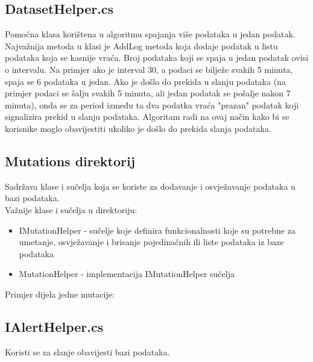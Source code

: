 \documentclass[zavrsnirad]{fer}
\begin{document}


\subsection{DatasetHelper.cs}
\label{pog:dataset_helper}
Pomoćna klasa korištena u algoritmu spajanja više podataka u jedan podatak. Najvažnija metoda u klasi je AddLog metoda koja dodaje podatak u listu podataka koja se kasnije vraća. Broj podataka koji se spaja u jedan podatak ovisi o intervalu. Na primjer ako je interval 30, a podaci se bilježe svakih 5 minuta, spaja se 6 podataka u jedan. Ako je došlo do prekida u slanju podataka (na primjer podaci se šalju svakih 5 minuta, ali jedan podatak se pošalje nakon 7 minuta), onda se za period između ta dva podatka vraća "prazan" podatak koji signalizira prekid u slanju podataka. Algoritam radi na ovaj način kako bi se korisnike moglo obavijestiti ukoliko je došlo do prekida slanja podataka.


\subsection{Mutations direktorij}
Sadržava klase i sučelja koja se koriste za dodavanje i osvježavanje podataka u bazi podataka.
\\Važnije klase i sučelja u direktoriju:
\begin{itemize}
	\item IMutationHelper - sučelje koje definira funkcionalnosti koje su potrebne za umetanje, osvježavanje i brisanje pojedinačnih ili liste podataka iz baze podataka
	\item MutationHelper - implementacija IMutationHelper sučelja
\end{itemize}
Primjer dijela jedne mutacije:


\subsection{IAlertHelper.cs}
Koristi se za slanje obavijesti bazi podataka.

\end{document}
